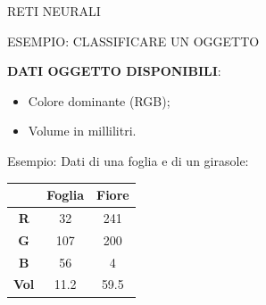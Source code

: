 \documentclass[aspectratio=1610]{beamer}
\begin{document}
\begin{frame}{RETI NEURALI}
    \begin{alertblock}{ESEMPIO: CLASSIFICARE UN OGGETTO}
        \begin{minipage}{0.96\linewidth}
            \justifying
            \bigskip
            \textbf{DATI OGGETTO DISPONIBILI}:
            \begin{itemize}
                \item Colore dominante (RGB);
                \item Volume in millilitri.
            \end{itemize}
            Esempio: Dati di una foglia e di un girasole:\\
            \begin{center}
                \begin{tabular}{c c c}
                    & \textbf{Foglia} & \textbf{Fiore} \\
                    \hline
                    \hline
                    \textbf{R} & 32 & 241 \\
                    \hline
                    \textbf{G} & 107 & 200 \\
                    \hline
                    \textbf{B} & 56 & 4 \\
                    \hline
                    \textbf{Vol} & 11.2 & 59.5 \\
                \end{tabular}
            \end{center}
        \end{minipage}
    \end{alertblock}
\end{frame}
\end{document}
